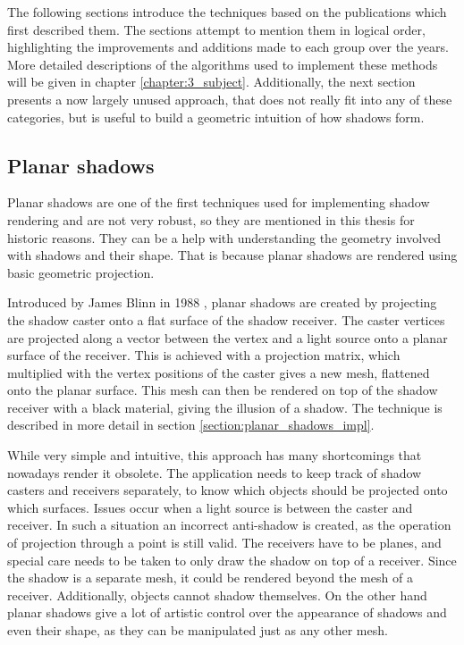 The following sections introduce the techniques based on the publications which first described them. The sections attempt to mention them in logical order, highlighting the improvements and additions made to each group over the years. More detailed descriptions of the algorithms used to implement these methods will be given in chapter \ref{chapter:3_subject}. Additionally, the next section presents a now largely unused approach, that does not really fit into any of these categories, but is useful to build a geometric intuition of how shadows form.

\subsection{Planar shadows} \label{section:planar_shadows}
Planar shadows are one of the first techniques used for implementing shadow rendering and are not very robust, so they are mentioned in this thesis for historic reasons. They can be a help with understanding the geometry involved with shadows and their shape. That is because planar shadows are rendered using basic geometric projection.

Introduced by James Blinn in 1988 \cite{bib:article:blinn_shadows}, planar shadows are created by projecting the shadow caster onto a flat surface of the shadow receiver. The caster vertices are projected along a vector between the vertex and a light source onto a planar surface of the receiver. This is achieved with a projection matrix, which multiplied with the vertex positions of the caster gives a new mesh, flattened onto the planar surface. This mesh can then be rendered on top of the shadow receiver with a black material, giving the illusion of a shadow. The technique is described in more detail in section \ref{section:planar_shadows_impl}.

While very simple and intuitive, this approach has many shortcomings that nowadays render it obsolete. The application needs to keep track of shadow casters and receivers separately, to know which objects should be projected onto which surfaces. Issues occur when a light source is between the caster and receiver. In such a situation an incorrect anti-shadow is created, as the operation of projection through a point is still valid. The receivers have to be planes, and special care needs to be taken to only draw the shadow on top of a receiver. Since the shadow is a separate mesh, it could be rendered beyond the mesh of a receiver. Additionally, objects cannot shadow themselves. On the other hand planar shadows give a lot of artistic control over the appearance of shadows and even their shape, as they can be manipulated just as any other mesh.

